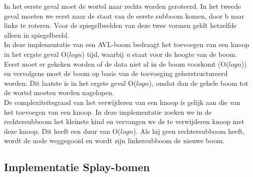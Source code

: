 \documentclass[a4paper,10pt]{article}
\begin{document}
\begin{center}
\end{center}

In het eerste geval moet de wortel naar rechts worden geroteerd. In het tweede geval moeten we eerst naar de staat van de eerste subboom komen, door b naar links te roteren. Voor de spiegelbeelden van deze twee vormen geldt hetzelfde alleen in spiegelbeeld. \\

In deze implementatie van een AVL-boom bedraagt het toevoegen van een knoop in het ergste geval O($logn$) tijd, waarbij \emph{n} staat voor de hoogte van de boom. Eerst moet er gekeken worden of de data niet al in de boom voorkomt (O($logn$)) en vervolgens moet de boom op basis van de toevoeging geherstructureerd worden. Dit laatste is in het ergste geval O($logn$), omdat dan de gehele boom tot de wortel moeten worden nagelopen. \\

De complexiteitsgraad van het verwijderen van een knoop is gelijk aan die van het toevoegen van een knoop. In deze implementatie zoeken we in de rechtersubboom het kleinste kind en vervangen we de te verwijderen knoop met deze knoop. Dit heeft een duur van O($logn$). Als hij geen rechtersubboom heeft, wordt de node weggegooid en wordt zijn linkersubboom de nieuwe boom.
\subsection{Implementatie Splay-bomen}
\end{document}
